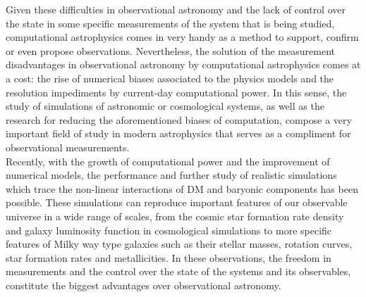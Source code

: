 \documentclass[12pt]{article}
\begin{document}
Given these difficulties in observational astronomy and the lack of control over the state in some specific measurements of the system that is being studied, computational astrophysics comes in very handy as a method to support, confirm or even propose observations. Nevertheless, the solution of the measurement disadvantages in observational astronomy by computational astrophysics comes at a cost: the rise of numerical biases associated to the physics models and the resolution impediments by current-day computational power. In this sense, the study of simulations of astronomic or cosmological systems, as well as the research for reducing the aforementioned biases of computation, compose a very important field of study in modern astrophysics that serves as a compliment for observational measurements.\\

Recently, with the growth of computational power and the improvement of numerical models, the performance and further study of realistic simulations which trace the non-linear interactions of DM and baryonic components has been possible. These simulations can reproduce important features of our observable universe in a wide range of scales, from the cosmic star formation rate density and galaxy luminosity function in cosmological simulations to more specific features of Milky way type galaxies such as their stellar masses, rotation curves, star formation rates and metallicities. In these observations, the freedom in measurements and the control over the state of the systems and its observables, constitute the biggest advantages over observational astronomy.\\
\end{document}
